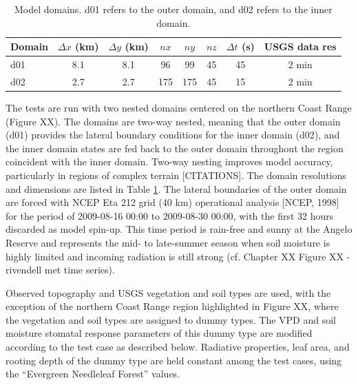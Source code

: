 \begin{table}
\begin{tabular}{ l c c c c c c c }
\hline
Domain & $\Delta x$ (km) & $\Delta y$ (km) & $nx$ & $ny$ & $nz$ & $\Delta t$ (s) & USGS data res \\ \hline
d01 & 8.1 & 8.1 & 96 & 99 & 45 & 45 & 2 min\\
d02 & 2.7 & 2.7 & 175 & 175 & 45 & 15 & 2 min\\
\hline
\end{tabular}
\caption{Model domains. d01 refers to the outer domain, and d02 refers to the inner domain.}
\label{table:BL_domains}
\end{table}

The tests are run with two nested domains centered on the northern Coast Range (Figure XX).  The domains are two-way nested, meaning that the outer domain (d01) provides the lateral boundary conditions for the inner domain (d02), and the inner domain states are fed back to the outer domain throughout the region coincident with the inner domain.  Two-way nesting improves model accuracy, particularly in regions of complex terrain [CITATIONS].  The domain resolutions and dimensions are listed in Table \ref{table:BL_domains}.  The lateral boundaries of the outer domain are forced with NCEP Eta 212 grid (40 km) operational analysis [NCEP, 1998] for the period of 2009-08-16 00:00 to 2009-08-30 00:00, with the first 32 hours discarded as model spin-up.  This time period is rain-free and sunny at the Angelo Reserve and represents the mid- to late-summer season when soil moisture is highly limited and incoming radiation is still strong (cf. Chapter XX Figure XX - rivendell met time series).

Observed topography and USGS vegetation and soil types are used, with the exception of the northern Coast Range region highlighted in Figure XX, where the vegetation and soil types are assigned to dummy types.  The VPD and soil moisture stomatal response parameters of this dummy type are modified according to the test case as described below.  Radiative properties, leaf area, and rooting depth of the dummy type are held constant among the test cases, using the ``Evergreen Needleleaf Forest'' values.

